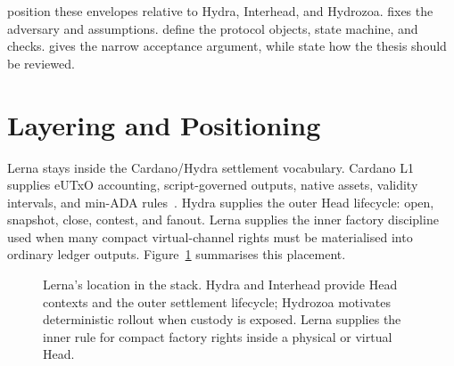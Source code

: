\documentclass[a4paper,11pt]{article}
\theoremstyle{definition}
\theoremstyle{plain}
\theoremstyle{remark}
\begin{document}
\noindent
{} position these envelopes relative to
Hydra, Interhead, and Hydrozoa.  fixes the adversary and
assumptions.
 define the
protocol objects, state machine, and checks.  gives the
narrow acceptance argument, while
 state how
the thesis should be reviewed.

\section{Layering and Positioning}
\label{sec:layering}

Lerna stays inside the Cardano/Hydra settlement vocabulary. Cardano L1 supplies
eUTxO accounting, script-governed outputs, native assets, validity intervals,
and min-ADA rules~\cite{cardano-eutxo}. Hydra supplies the
outer Head lifecycle: open, snapshot, close, contest, and fanout. Lerna supplies
the inner factory discipline used when many compact virtual-channel rights must
be materialised into ordinary ledger outputs. Figure~\ref{fig:stack} summarises
this placement.

\begin{figure}[t]
\centering
{}
\caption{Lerna's location in the stack. Hydra and Interhead provide Head
contexts and the outer settlement lifecycle; Hydrozoa motivates deterministic
rollout when custody is exposed. Lerna supplies the inner rule for compact
factory rights inside a physical or virtual Head.}
\label{fig:stack}
\end{figure}
\end{document}
